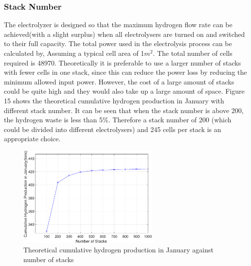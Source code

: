 \subsubsection{Stack Number}
The electrolyzer is designed so that the maximum hydrogen flow rate can be achieved(with a slight surplus) when all electrolysers are turned on and switched to their full capacity. The total power used in the electrolysis process can be calculated by,
Assuming a typical cell area of 1$m^2$. The total number of cells required is 48970. Theoretically it is preferable to use a larger number of stacks with fewer cells in one stack, since this can reduce the power loss by reducing the minimum allowed input power. However,  the cost of a large amount of stacks could be quite high and they would also take up a large amount of space. Figure 15 shows the theoretical cumulative hydrogen production in January with different stack number. It can be seen that when the stack number is above 200, the hydrogen waste is less than 5\%. Therefore a stack number of 200 (which could be divided into different electrolysers) and 245 cells per stack is an appropriate choice.
 \begin{figure}[H] 
 \centering
\includegraphics[width=7cm]{stack.eps}
\caption{Theoretical cumulative hydrogen production in January against number of stacks}
\label{fig:}
\end{figure}
 

